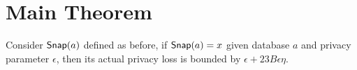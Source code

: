 \documentclass[a4paper,11pt]{article}
\begin{document}



\newpage
\section{Main Theorem}

\begin{thm}
Consider $\mathsf{Snap}(a)$ defined as before, if $\mathsf{Snap}(a) = x$ given database $a$ and privacy parameter $\epsilon$, then its actual privacy loss is bounded by $\epsilon + 23 B \epsilon \eta$.
\end{thm}
\end{document}

